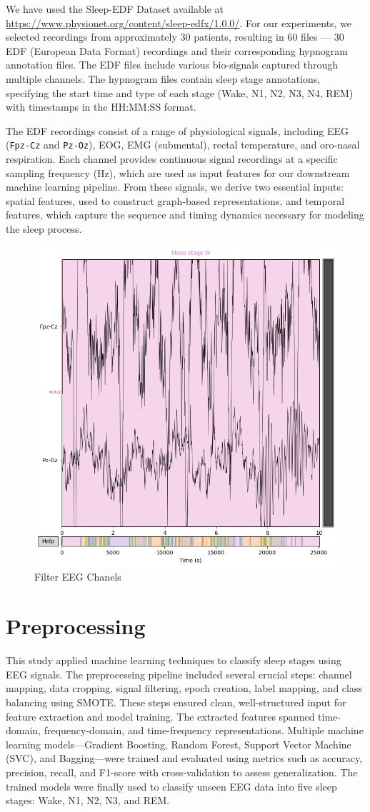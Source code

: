 We have used the Sleep-EDF Dataset available at \url{https://www.physionet.org/content/sleep-edfx/1.0.0/}. For our experiments, we selected recordings from approximately 30 patients, resulting in 60 files — 30 EDF (European Data Format) recordings and their corresponding hypnogram annotation files. The EDF files include various bio-signals captured through multiple channels. The hypnogram files contain sleep stage annotations, specifying the start time and type of each stage (Wake, N1, N2, N3, N4, REM) with timestamps in the HH:MM:SS format.

The EDF recordings consist of a range of physiological signals, including EEG (\texttt{Fpz-Cz} and \texttt{Pz-Oz}), EOG, EMG (submental), rectal temperature, and oro-nasal respiration. Each channel provides continuous signal recordings at a specific sampling frequency (Hz), which are used as input features for our downstream machine learning pipeline. From these signals, we derive two essential inputs: spatial features, used to construct graph-based representations, and temporal features, which capture the sequence and timing dynamics necessary for modeling the sleep process.


\begin{figure}
	\centering
	\includegraphics[width=0.4\linewidth]{"./img/paper_1/EEG_Filter_chanel.png"}
	\caption{Filter EEG Chanels}
	\label{fig:eegfilterchanel}
\end{figure}


\section{Preprocessing}

This study applied machine learning techniques to classify sleep stages using EEG signals. The preprocessing pipeline included several crucial steps: channel mapping, data cropping, signal filtering, epoch creation, label mapping, and class balancing using SMOTE. These steps ensured clean, well-structured input for feature extraction and model training. The extracted features spanned time-domain, frequency-domain, and time-frequency representations. Multiple machine learning models—Gradient Boosting, Random Forest, Support Vector Machine (SVC), and Bagging—were trained and evaluated using metrics such as accuracy, precision, recall, and F1-score with cross-validation to assess generalization. The trained models were finally used to classify unseen EEG data into five sleep stages: Wake, N1, N2, N3, and REM.


